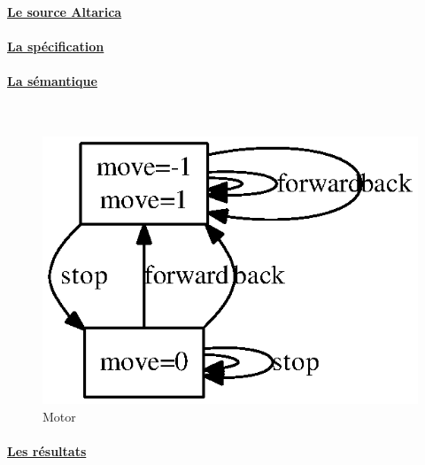     \paragraph{\underline{Le source Altarica\\}}
    
    
    \paragraph{\underline{La spécification\\}}
    
    
    \paragraph{\underline{La sémantique\\}}
    ~\\
\begin{figure}[!ht]
     \begin{center}
      \includegraphics{../src/altarica/Motor.eps}
      \caption{Motor}
     \end{center}
    \end{figure}

    \paragraph{\underline{Les résultats\\}}
    
    
   
